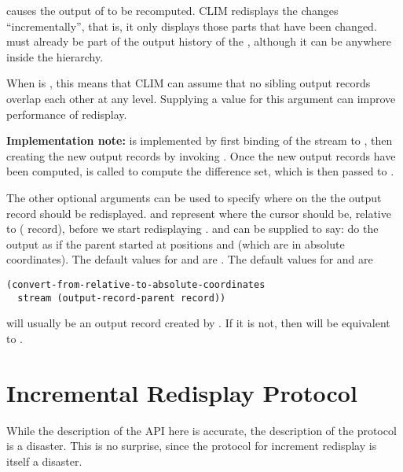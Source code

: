  causes the output of
 to be recomputed.
CLIM redisplays the changes ``incrementally'', that is, it only displays those
parts that have been changed.  must already be part of the output
history of the  , although it can be
anywhere inside the hierarchy.

When  is , this means that CLIM can assume
that no sibling output records overlap each other at any level.  Supplying a
 value for this argument can improve performance of redisplay.

{\bf Implementation note:}  is implemented by first
binding  of the stream to , then creating
the new output records by invoking .  Once the
new output records have been computed,  is called to
compute the difference set, which is then passed to
.

The other optional arguments can be used to specify where on the 
the output record should be redisplayed.   and  represent where
the cursor should be, relative to ( record), before we
start redisplaying .   and  can be
supplied to say: do the output as if the parent started at positions
 and  (which are in absolute coordinates).  The
default values for  and  are .  The default values for  and  are

\begin{verbatim}
(convert-from-relative-to-absolute-coordinates 
  stream (output-record-parent record))
\end{verbatim}

 will usually be an output record created by .
If it is not, then  will be equivalent to
.


\section {Incremental Redisplay Protocol}

 {While the description of the API here is accurate, the description
of the protocol is a disaster.  This is no surprise, since the protocol for
increment redisplay is itself a disaster.}

